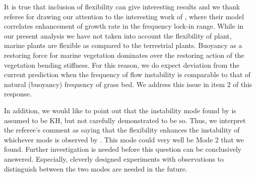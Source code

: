 \documentclass[letterpaper,10pt]{article}
\begin{document}
\begin{enumerate}
It is true that inclusion of flexibility can give interesting results and we thank referee for drawing our attention to the interesting work of \cite{Gosselin2009}, where their model correlates enhancement of growth rate in the frequency lock-in range. 
While in our present analysis we have not taken into account the flexibility of plant, marine plants are flexible as compared to the terrestrial plants.
Buoyancy as a restoring force for marine vegetation dominates over the restoring action of the vegetation bending stiffness.
For this reason, we do expect deviation from the current prediction when the frequency of flow instability is comparable to that of natural (buoyancy) frequency of grass bed.  
We address this issue in item 2 of this response.

In addition, we would like to point out that the instability mode found by \cite{Gosselin2009} is assumed to be KH, but not carefully demonstrated to be so.
Thus, we interpret the referee's comment as saying that the flexibility enhances the instability of whichever mode is observed by \cite{Gosselin2009}. 
This mode could very well be Mode 2 that we found. 
Further investigation is needed before this question can be conclusively answered.
Especially, cleverly designed experiments with observations to distinguish between the two modes are needed in the future.

\end{enumerate}

{}

% 
% 
% 
% 
% 
% 
% 
\end{document}
